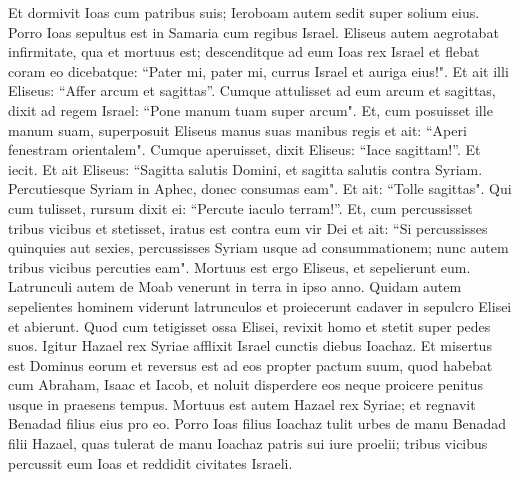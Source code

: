 \begin{biblechapter}
\verse Et dormivit Ioas cum patribus suis; Ieroboam autem sedit super solium eius. Porro Ioas sepultus est in Samaria cum regibus Israel. 
\verse Eliseus autem aegrotabat infirmitate, qua et mortuus est; descenditque ad eum Ioas rex Israel et flebat coram eo dicebatque: “Pater mi, pater mi, currus Israel et auriga eius!". 
\verse Et ait illi Eliseus: “Affer arcum et sagittas”. Cumque attulisset ad eum arcum et sagittas, 
\verse dixit ad regem Israel: “Pone manum tuam super arcum". Et, cum posuisset ille manum suam, superposuit Eliseus manus suas manibus regis 
\verse et ait: “Aperi fenestram orientalem". Cumque aperuisset, dixit Eliseus: “Iace sagittam!”. Et iecit. Et ait Eliseus: “Sagitta salutis Domini, et sagitta salutis contra Syriam. Percutiesque Syriam in Aphec, donec consumas eam". 
\verse Et ait: “Tolle sagittas". Qui cum tulisset, rursum dixit ei: “Percute iaculo terram!”. Et, cum percussisset tribus vicibus et stetisset, 
\verse iratus est contra eum vir Dei et ait: “Si percussisses quinquies aut sexies, percussisses Syriam usque ad consummationem; nunc autem tribus vicibus percuties eam". 
\verse Mortuus est ergo Eliseus, et sepelierunt eum. Latrunculi autem de Moab venerunt in terra in ipso anno. 
\verse Quidam autem sepelientes hominem viderunt latrunculos et proiecerunt cadaver in sepulcro Elisei et abierunt. Quod cum tetigisset ossa Elisei, revixit homo et stetit super pedes suos. 
\verse Igitur Hazael rex Syriae afflixit Israel cunctis diebus Ioachaz. 
\verse Et misertus est Dominus eorum et reversus est ad eos propter pactum suum, quod habebat cum Abraham, Isaac et Iacob, et noluit disperdere eos neque proicere penitus usque in praesens tempus. 
\verse Mortuus est autem Hazael rex Syriae; et regnavit Benadad filius eius pro eo. 
\verse Porro Ioas filius Ioachaz tulit urbes de manu Benadad filii Hazael, quas tulerat de manu Ioachaz patris sui iure proelii; tribus vicibus percussit eum Ioas et reddidit civitates Israeli. 
\end{biblechapter}

